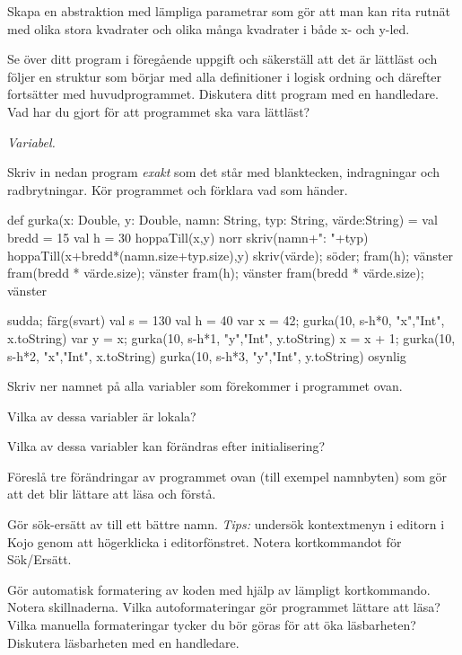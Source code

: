 \Subtask Skapa en abstraktion  med lämpliga parametrar som gör att man kan rita rutnät med olika stora kvadrater och olika många kvadrater i både x- och y-led.

\Subtask\Checkpoint Se över ditt program i föregående uppgift och säkerställ att det är lättläst och följer en struktur som börjar med alla definitioner i logisk ordning och därefter fortsätter med huvudprogrammet. Diskutera ditt program med en handledare. Vad har du gjort för att programmet ska vara lättläst?


\Task \emph{Variabel.}

\Subtask Skriv in nedan program \emph{exakt} som det står med blanktecken, indragningar och radbrytningar. Kör programmet och förklara vad som händer.

\begin{Code}
def gurka(x: Double,
          y: Double, namn: String,
          typ: String,
          värde:String) = {
  val bredd = 15
  val h = 30
  hoppaTill(x,y)
  norr
  skriv(namn+": "+typ)
  hoppaTill(x+bredd*(namn.size+typ.size),y)
  skriv(värde); söder; fram(h); vänster
  fram(bredd * värde.size); vänster
  fram(h); vänster
  fram(bredd * värde.size); vänster
}

sudda; färg(svart)
val s = 130
val h = 40
var x = 42; gurka(10, s-h*0, "x","Int", x.toString)
var y = x;  gurka(10, s-h*1, "y","Int", y.toString)
x = x + 1;  gurka(10, s-h*2, "x","Int", x.toString)
            gurka(10, s-h*3, "y","Int", y.toString)
osynlig
\end{Code}

\Subtask\Pen Skriv ner namnet på alla variabler som förekommer i programmet ovan.

\Subtask\Pen Vilka av dessa variabler är lokala?

\Subtask\Pen Vilka av dessa variabler kan förändras efter initialisering?

\Subtask\Pen Föreslå tre förändringar av programmet ovan (till exempel namnbyten) som gör att det blir lättare att läsa och förstå.

\Subtask Gör sök-ersätt av  till ett bättre namn. \emph{Tips:} undersök kontextmenyn i editorn i Kojo genom att högerklicka i editorfönstret. Notera kortkommandot för Sök/Ersätt.

\Subtask\Checkpoint Gör automatisk formatering av koden med hjälp av lämpligt kortkommando. Notera skillnaderna. Vilka autoformateringar gör programmet lättare att läsa? Vilka manuella formateringar tycker du bör göras för att öka läsbarheten? Diskutera läsbarheten med en handledare.

